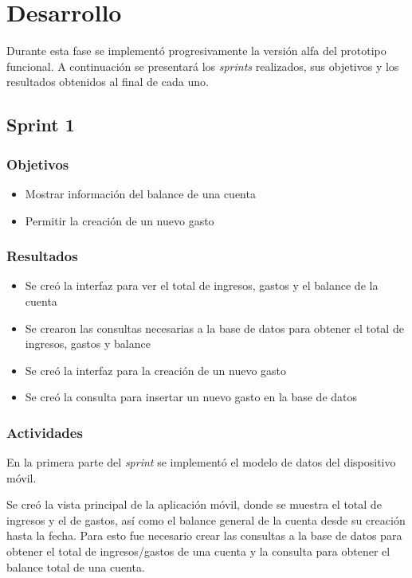 \section{Desarrollo} \label{sect:desarrollo}

Durante esta fase se implementó progresivamente la versión alfa del prototipo funcional. A continuación se presentará los \textit{sprints} realizados, sus objetivos y los resultados obtenidos al final de cada uno.

\subsection{Sprint 1}

\subsubsection{Objetivos}
	\begin{itemize}
	\item Mostrar información del balance de una cuenta
	\item Permitir la creación de un nuevo gasto
	\end{itemize}

\subsubsection{Resultados}
\begin{itemize}
\item Se creó la interfaz para ver el total de ingresos, gastos y el balance de la cuenta
\item Se crearon las consultas necesarias a la base de datos para obtener el total de ingresos, gastos y balance
\item Se creó la interfaz para la creación de un nuevo gasto
\item Se creó la consulta para insertar un nuevo gasto en la base de datos
\end{itemize}

\subsubsection{Actividades}
En la primera parte del \textit{sprint} se implementó el modelo de datos del dispositivo móvil.

Se creó la vista principal de la aplicación móvil, donde se muestra el total de ingresos y el de gastos, así como el balance general de la cuenta desde su creación hasta la fecha. Para esto fue necesario crear las consultas a la base de datos para obtener el total de ingresos/gastos de una cuenta y la consulta para obtener el balance total de una cuenta.

